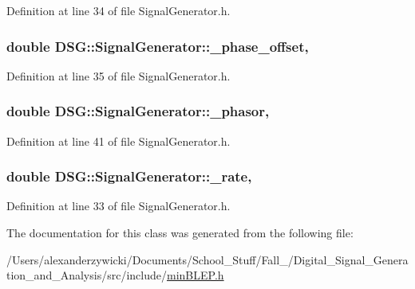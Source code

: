 Definition at line 34 of file Signal\-Generator.\-h.

\hypertarget{classDSG_1_1SignalGenerator_a9abf9d00c798e0fdca6314f17547758a}{
\subsubsection[{\-\_\-phase\-\_\-offset}]{\setlength{\rightskip}{0pt plus 5cm}double D\-S\-G\-::\-Signal\-Generator\-::\-\_\-phase\-\_\-offset\hspace{0.3cm}{\ttfamily [protected]}, {\ttfamily [inherited]}}}\label{classDSG_1_1SignalGenerator_a9abf9d00c798e0fdca6314f17547758a}


Definition at line 35 of file Signal\-Generator.\-h.

\hypertarget{classDSG_1_1SignalGenerator_ac2271b582bf699275f077ecb642a8cd9}{
\subsubsection[{\-\_\-phasor}]{\setlength{\rightskip}{0pt plus 5cm}double D\-S\-G\-::\-Signal\-Generator\-::\-\_\-phasor\hspace{0.3cm}{\ttfamily [protected]}, {\ttfamily [inherited]}}}\label{classDSG_1_1SignalGenerator_ac2271b582bf699275f077ecb642a8cd9}


Definition at line 41 of file Signal\-Generator.\-h.

\hypertarget{classDSG_1_1SignalGenerator_aa10f6c85d9adee901139ea7fb346f39d}{
\subsubsection[{\-\_\-rate}]{\setlength{\rightskip}{0pt plus 5cm}double D\-S\-G\-::\-Signal\-Generator\-::\-\_\-rate\hspace{0.3cm}{\ttfamily [protected]}, {\ttfamily [inherited]}}}\label{classDSG_1_1SignalGenerator_aa10f6c85d9adee901139ea7fb346f39d}


Definition at line 33 of file Signal\-Generator.\-h.



The documentation for this class was generated from the following file\-:\begin{DoxyCompactItemize}
\item 
/\-Users/alexanderzywicki/\-Documents/\-School\-\_\-\-Stuff/\-Fall\-\_/\-Digital\-\_\-\-Signal\-\_\-\-Generation\-\_\-and\-\_\-\-Analysis/src/include/\hyperlink{minBLEP_8h}{min\-B\-L\-E\-P.\-h}\end{DoxyCompactItemize}
